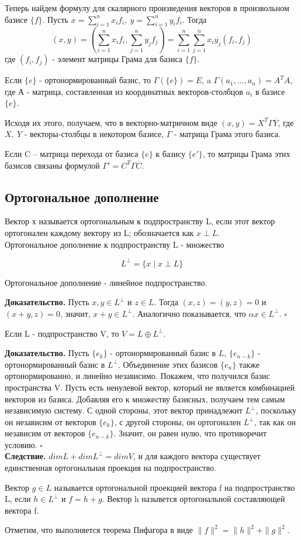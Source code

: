 Теперь найдем формулу для скалярного произведения векторов в произвольном 
базисе $\{f\}$. Пусть $x=\sum\limits^n_{i=1}x_if_i,~y=\sum\limits^n_{i=1}y_if_i$.
Тогда
$$(x,y)=(\sum\limits^n_{i=1}x_if_i,\sum\limits^n_{j=1}y_jf_j)=\sum\limits^n_
{i=1}\sum\limits^n_{j=1}x_i\overline{y_j}(f_i,f_j)$$
где $(f_i,f_j)$ - элемент матрицы Грама для базиса $\{f\}$.

Если $\{e\}$ - ортонормированный базис, то $\Gamma(\{e\})=E$, a
$\Gamma(a_1,...,a_n)=A^TA$, где А - матрица, составленная из координатных 
векторов-столбцов $a_i$ в базисе $\{e\}$.

Исходя их этого, получаем, что в векторно-матричном виде 
$(x,y)=X^T\Gamma\overline{Y}$, где $X,~Y$ - векторы-столбцы в некотором базисе,
$\Gamma$ - матрица Грама этого базиса.

Если C – матрица перехода от базиса $\{e\}$ к базису
$\{e'\}$, то матрицы Грама этих базисов связаны формулой $\Gamma'=C^T\Gamma 
\overline{C}$.

\subsection{Ортогональное дополнение}
\begin{defin}
Вектор х называется ортогональным к подпространству L, если этот вектор
ортогонален каждому вектору из L; обозначается как $x\perp L$.\\
Ортогональное дополнение к подпространству L - множество 
\end{defin}
$$L^\perp=\{x\mid x\perp L\}$$
\begin{theor}
Ортогональное дополнение - линейное подпространство.
\end{theor}
\textbf{Доказательство.} Пусть $x,y\in L^\perp$ и $z\in L$. Тогда 
$(x,z)=(y,z)=0$ и $(x+y,z)=0$, значит, $x+y\in L^\perp$. Аналогично 
показывается, что $\alpha x\in L^\perp$. $\square$
\begin{theor}
Если L - подпространство V, то $V=L\oplus L^\perp$.
\end{theor}
\textbf{Доказательство.} Пусть $\{e_k\}$ - ортонормированный базис в 
$L$, $\{e_{n-k}\}$ - ортонормированный базис в $L^\perp$. Объединение этих 
базисов $\{e_n\}$ также ортонормированно, и линейно независимо. Покажем, что 
получился базис пространства V. Пусть есть ненулевой вектор, который не 
является комбинацией векторов из базиса. Добавляя его к множеству базисных, 
получаем тем самым независимую систему. С одной стороны, этот вектор 
принадлежит $L^\perp$, поскольку он независим от векторов $\{e_k\}$, с другой 
стороны, он ортогонален $L^\perp$, так как он независим от векторов 
$\{e_{n-k}\}$. Значит, он равен нулю, что противоречит условию. $\square$ \\
\textbf{Следствие.} $dimL+dimL^\perp=dimV$, и для каждого вектора существует
единственная ортогональная проекция на подпространство. 
\begin{defin}
Вектор $g\in L$ называется ортогональной проекцией вектора f на 
подпространство L, если $h\in L^\perp$ и $f=h+g$. Вектор h назывется
ортогональной составляющей вектора f.
\end{defin}
Отметим, что выполняется теорема Пифагора в виде $\|f\|^2=\|h\|^2+\|g\|^2$.

